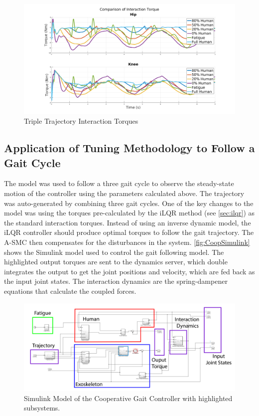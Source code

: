 \begin{figure}
    \centering
    \includegraphics[width=\columnwidth]{images/controllers/trajs/interactions.png}
    \caption[Triple Trajectory Interaction Torques]{Triple Trajectory Interaction Torques}
    \label{fig:InteractionTripleTraj}
\end{figure}


\subsection{Application of Tuning Methodology to Follow a Gait Cycle}


The model was used to follow a three gait cycle to observe the steady-state motion of the controller using the parameters calculated above. The trajectory was auto-generated by combining three gait cycles. One of the key changes to the model was using the torques pre-calculated by the iLQR method (see \autoref{sec:ilqr}) as the standard interaction torques. Instead of using an inverse dynamic model, the iLQR controller should produce optimal torques to follow the gait trajectory. The A-SMC then compensates for the disturbances in the system. \autoref{fig:CoopSimulink} shows the Simulink model used to control the gait following model. The highlighted output torques are sent to the dynamics server, which double integrates the output to get the joint positions and velocity, which are fed back as the input joint states. The interaction dynamics are the spring-dampener equations that calculate the coupled forces.  



\begin{figure}[h!]
    \centering
    \includegraphics[width=\columnwidth]{images/controllers/upper_model_simulink_edit.png}
    \caption[Simulink Model Cooperative Controller]{Simulink Model of the Cooperative Gait Controller with highlighted subsystems.}
    \label{fig:CoopSimulink}
\end{figure}


